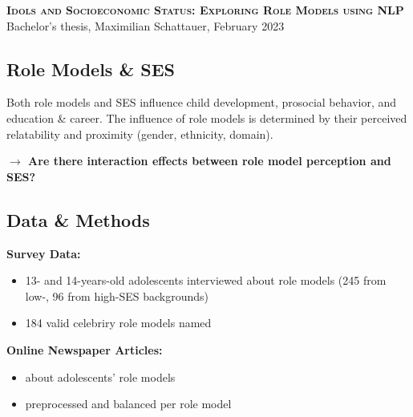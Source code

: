 

\fontsize{10}{10}
\geometry{a4paper, margin=2cm}


    \begin{center}
        \textsf{\textbf{\large{\textsc{Idols and Socioeconomic Status: Exploring Role Models using NLP}}}}\\
        Bachelor's thesis, Maximilian Schattauer, February 2023
    \end{center}


    \subsection*{Role Models \& SES}
    Both role models and SES influence child development, prosocial behavior, and education \& career.
    The influence of role models is determined by their perceived relatability and proximity (gender, ethnicity, domain).

    \textbf{$\rightarrow$ Are there interaction effects between role model perception and SES?}


    \subsection*{Data \& Methods}
    \begin{minipage}[t]{0.48\textwidth}
        \textbf{Survey Data:}
        \begin{itemize}
            \item 13- and 14-years-old adolescents interviewed about role models (245 from low-, 96 from high-SES backgrounds)
            \item 184 valid celebriry role models named
        \end{itemize}
    \end{minipage}
    \hspace{0.04\textwidth}
    \begin{minipage}[t]{0.48\textwidth}
        \textbf{Online Newspaper Articles:}
        \begin{itemize}
            \item about adolescents' role models
            \item preprocessed and balanced per role model
        \end{itemize}
    \end{minipage}

